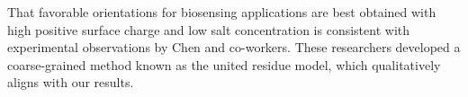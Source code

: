 That favorable orientations for biosensing applications are best obtained with high positive surface charge and low salt concentration is consistent with experimental observations by Chen and co-workers. \cite{ChenLiuZhouJiang2003} These researchers developed a coarse-grained method known as the united residue model,\cite{ZhouChenJiang2003} which qualitatively aligns with our results.
 
